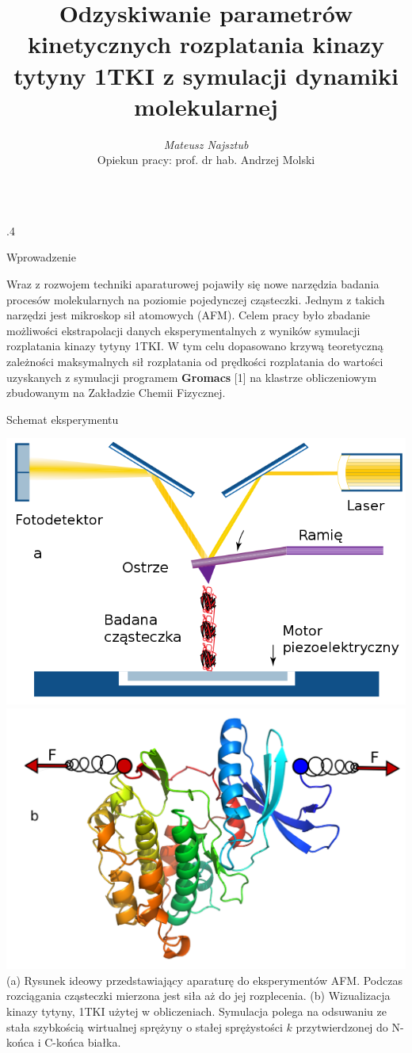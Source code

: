 \documentclass[final, t]{beamer} %
\title{Odzyskiwanie parametrów kinetycznych rozplatania kinazy tytyny 1TKI z symulacji dynamiki molekularnej}
\author{\textit{Mateusz Najsztub}\\ Opiekun pracy:  prof. dr hab. Andrzej Molski}
\institute{Zakład Chemii Fizycznej Uniwersytetu im. Adama Mickiewicza w Poznaniu}
\date{}
\begin{document}
  \begin{frame}{} 
 \begin{columns}[T]
  \begin{column} {.4\textwidth}
    \begin{block}{Wprowadzenie}
    \centering
    \begin{minipage}{0.97\textwidth}

    Wraz z rozwojem techniki aparaturowej pojawiły się nowe narzędzia badania procesów molekularnych na poziomie pojedynczej cząsteczki. Jednym z takich narzędzi jest mikroskop sił atomowych (AFM). Celem pracy było zbadanie możliwości ekstrapolacji danych eksperymentalnych z wyników symulacji rozplatania kinazy tytyny 1TKI. W tym celu dopasowano krzywą teoretyczną zależności maksymalnych sił rozplatania od prędkości rozplatania do wartości uzyskanych z symulacji programem \textbf{Gromacs} [1] na klastrze obliczeniowym zbudowanym na Zakładzie Chemii Fizycznej.
    \end{minipage}
        \end{block}
        \begin{block}{Schemat eksperymentu}
        \centering
         \begin{minipage}{0.97\textwidth}

        \includegraphics[width=0.48\linewidth]{afm1.png}
        \includegraphics[width=0.48\linewidth]{mol.png}\\

        (a) Rysunek ideowy przedstawiający aparaturę do eksperymentów AFM. Podczas rozciągania cząsteczki mierzona jest siła aż do jej rozplecenia. (b) Wizualizacja kinazy tytyny, 1TKI użytej w obliczeniach. Symulacja polega na odsuwaniu ze stała szybkością wirtualnej sprężyny o stałej sprężystości $k$ przytwierdzonej do N-końca i C-końca białka.
        \end{minipage}
        

\end{block}
\end{column}
\end{columns}
\end{frame}
\end{document}
